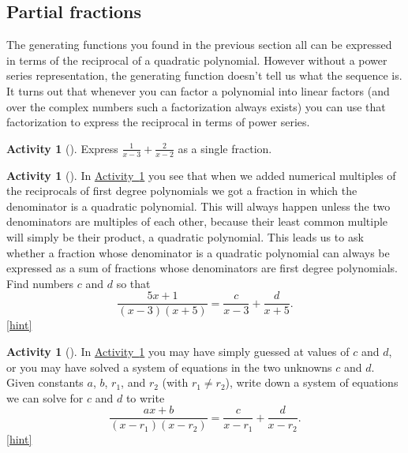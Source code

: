 \documentclass[10pt,]{book}
\theoremstyle{plain}
\theoremstyle{definition}
\theoremstyle{definition}
\theoremstyle{definition}
\newtheorem{activity}[project]{Activity}
\numberwithin{equation}{chapter}
\begin{document}
\subsection[{Partial fractions}]{Partial fractions}\label{subsection-38}
\hypertarget{p-1353}{}%
The generating functions you found in the previous section all can be expressed in terms of the reciprocal of a quadratic polynomial. However without a power series representation, the generating function doesn't tell us what the sequence is. It turns out that whenever you can factor a polynomial into linear factors (and over the complex numbers such a factorization always exists) you can use that factorization to express the reciprocal in terms of power series.%
\begin{activity}[]\label{simplifysumoffractions}
\hypertarget{p-1354}{}%
Express \(\frac{1}{x-3} + \frac{2}{x-2}\) as a single fraction.%
\end{activity}
\begin{activity}[]\label{partialfractionsintro}
\hypertarget{p-1356}{}%
In \hyperref[simplifysumoffractions]{Activity~\ref{simplifysumoffractions}} you see that when we added numerical multiples of the reciprocals of first degree polynomials we got a fraction in which the denominator is a quadratic polynomial. This will always happen unless the two denominators are multiples of each other, because their least common multiple will simply be their product, a quadratic polynomial. This leads us to ask whether a fraction whose denominator is a quadratic polynomial can always be expressed as a sum of fractions whose denominators are first degree polynomials. Find numbers \(c\) and \(d\) so that%
\begin{equation*}
\frac{5x+1}{(x-3)(x+5)} = \frac{c}{x-3} + \frac{d}{x+5}.
\end{equation*}
%
\hfill{\tiny\hyperlink{a-264}{[hint]}\hypertarget{q-264}{}}\end{activity}
\begin{activity}[]\label{partialfractions1}
\hypertarget{p-1359}{}%
In \hyperref[partialfractionsintro]{Activity~\ref{partialfractionsintro}} you may have simply guessed at values of \(c\) and \(d\), or you may have solved a system of equations in the two unknowns \(c\) and \(d\). Given constants \(a\), \(b\), \(r_1\), and \(r_2\) (with \(r_1\not= r_2\)), write down a system of equations we can solve for \(c\) and \(d\) to write%
\begin{equation*}
\frac{ax+b}{(x-r_1)(x-r_2)} = \frac{c}{x-r_1} + \frac{d}{x-r_2}\text{.}
\end{equation*}
%
\hfill{\tiny\hyperlink{a-265}{[hint]}\hypertarget{q-265}{}}\end{activity}
\end{document}
